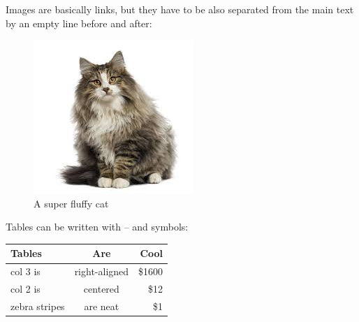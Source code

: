 \documentclass[a4paper]{article}
\begin{document}
  Images are basically links, but they have to be also separated from the
  main text by an empty line before and after:
  
  \begin{figure}[htbp]
  \centering
  \includegraphics{images/fluffycat.jpg}
  \caption{A super fluffy cat}
  \end{figure}
  
  
  Tables can be written with -- and \textbar{}\textbar{} symbols:
  
  \begin{longtable}[]{@{}lcr@{}}
  \toprule
  Tables & Are & Cool\tabularnewline
  \midrule
  \endhead
  col 3 is & right-aligned & \$1600\tabularnewline
  col 2 is & centered & \$12\tabularnewline
  zebra stripes & are neat & \$1\tabularnewline
  \bottomrule
  \end{longtable}
  
  
    
    
  \newpage
  \eightpt
  

  

\end{document}
